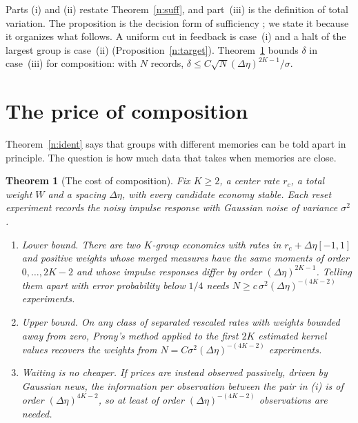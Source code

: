 \documentclass[12pt]{article}
\newtheorem{theorem}{Theorem}[section]
\theoremstyle{definition}
\theoremstyle{remark}
\begin{document}
Parts (i) and (ii) restate Theorem~\ref{n:suff}, and part~(iii) is the definition of total variation. The proposition is the decision form of sufficiency \citep{blackwell1953,lecam1964}; we state it because it organizes what follows. A uniform cut in feedback is case~(i) and a halt of the largest group is case~(ii) (Proposition~\ref{n:target}). Theorem~\ref{n:cost} bounds $\delta$ in case~(iii) for composition: with $N$ records, $\delta\le C\sqrt N(\Delta\eta)^{2K-1}/\sigma$.

\section{The price of composition}\label{n:cost_sec}

Theorem~\ref{n:ident} says that groups with different memories can be told apart in principle. The question is how much data that takes when memories are close.

\begin{theorem}[The cost of composition]\label{n:cost}
Fix $K\ge2$, a center rate $r_c$, a total weight $W$ and a spacing $\Delta\eta$, with every candidate economy stable. Each reset experiment records the noisy impulse response with Gaussian noise of variance $\sigma^2$.
\begin{enumerate}[label=(\roman*),itemsep=1pt]
\item \emph{Lower bound.} There are two $K$-group economies with rates in $r_c+\Delta\eta[-1,1]$ and positive weights whose merged measures have the same moments of order $0,\ldots,2K-2$ and whose impulse responses differ by order $(\Delta\eta)^{2K-1}$. Telling them apart with error probability below $1/4$ needs $N\ge c\,\sigma^2(\Delta\eta)^{-(4K-2)}$ experiments.
\item \emph{Upper bound.} On any class of separated rescaled rates with weights bounded away from zero, Prony's method applied to the first $2K$ estimated kernel values recovers the weights from $N=C\sigma^2(\Delta\eta)^{-(4K-2)}$ experiments.
\item \emph{Waiting is no cheaper.} If prices are instead observed passively, driven by Gaussian news, the information per observation between the pair in (i) is of order $(\Delta\eta)^{4K-2}$, so at least of order $(\Delta\eta)^{-(4K-2)}$ observations are needed.
\end{enumerate}
\end{theorem}
\end{document}
